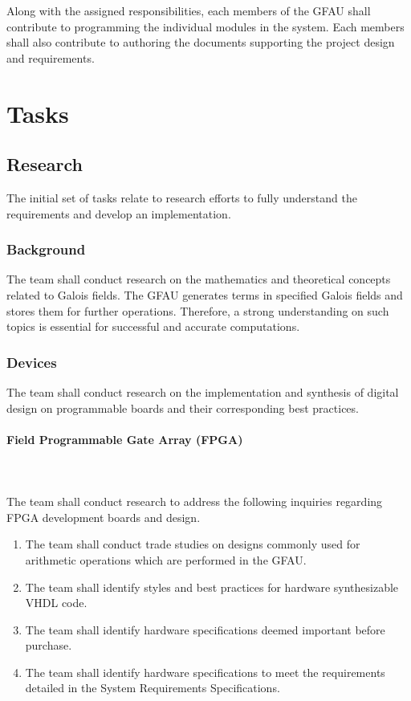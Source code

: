 \documentclass[12pt]{extarticle}
\begin{document}
    Along with the assigned responsibilities, each members of the GFAU shall
    contribute to programming the individual modules in the system. Each
    members shall also contribute to authoring the documents supporting the
    project design and requirements.

    \section{Tasks}

        \subsection{Research} The initial set of tasks relate to research
        efforts to fully understand the requirements and develop an
        implementation.

            \subsubsection{Background} The team shall conduct research on the
            mathematics and theoretical concepts related to Galois fields. The
            GFAU generates terms in specified Galois fields and stores them for
            further operations. Therefore, a strong understanding on such
            topics is essential for successful and accurate computations.

            \subsubsection{Devices} The team shall conduct research on the
            implementation and synthesis of digital design on programmable
            boards and their corresponding best practices.
            
                \paragraph{Field Programmable Gate Array (FPGA)} \leavevmode
                \\~\\ The team shall conduct research to address the following
                inquiries regarding FPGA development boards and design.
                \begin{enumerate}
                    \item The team shall conduct trade studies on designs
                    commonly used for arithmetic operations which are performed
                    in the GFAU.
                    \item The team shall identify styles and best practices for
                    hardware synthesizable VHDL code.
                    \item The team shall identify hardware specifications
                    deemed important before purchase.
                    \item The team shall identify hardware specifications to
                    meet the requirements detailed in the System Requirements
                    Specifications.
                \end{enumerate}
\end{document}
